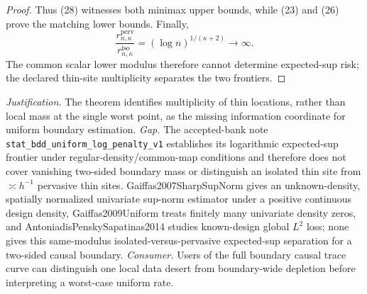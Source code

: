 \documentclass{article}
\begin{document}
\begin{proof}
Thus (28) witnesses both minimax upper bounds, while (23) and (26) prove
the matching lower bounds.  Finally,
\[
 \frac{r_{n,\kappa}^{\mathrm{perv}}}{r_{n,\kappa}^{\mathrm{iso}}}
 =(\log n)^{1/(\kappa+2)}\longrightarrow\infty.
\]
The common scalar lower modulus therefore cannot determine expected-sup
risk; the declared thin-site multiplicity separates the two frontiers.
\end{proof}
\par\smallskip\noindent \textit{Justification.} The theorem identifies multiplicity of thin locations, rather than local mass at the single worst point, as the missing information coordinate for uniform boundary estimation. \textit{Gap.} The accepted-bank note \texttt{stat\_bdd\_uniform\_log\_penalty\_v1} establishes its logarithmic expected-sup frontier under regular-density/common-map conditions and therefore does not cover vanishing two-sided boundary mass or distinguish an isolated thin site from \(\asymp h^{-1}\) pervasive thin sites. Gaiffas2007SharpSupNorm gives an unknown-density, spatially normalized univariate sup-norm estimator under a positive continuous design density, Gaiffas2009Uniform treats finitely many univariate density zeros, and AntoniadisPenskySapatinas2014 studies known-design global \(L^2\) loss; none gives this same-modulus isolated-versus-pervasive expected-sup separation for a two-sided causal boundary. \textit{Consumer.} Users of the full boundary causal trace curve can distinguish one local data desert from boundary-wide depletion before interpreting a worst-case uniform rate.
\end{document}
